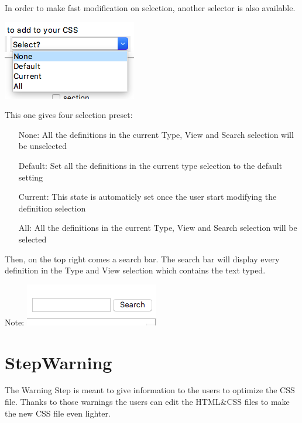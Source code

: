\documentclass[10pt,letterpaper]{article}
\begin{document}
In order to make fast modification on selection, another selector is also available. 
\begin{center} 
\includegraphics[scale=0.6]{selectionselect}
\end{center}
This one gives four selection preset:
\begin{itemize}
\item[None:]All the definitions in the current Type, View and Search selection will be unselected
\item[Default:] Set all the definitions in the current type selection to the default setting
\item[Current:] This state is automaticly set once the user start modifying the definition selection
\item[All:]All the definitions in the current Type, View and Search selection will be selected\\
\end{itemize}
Then, on the top right comes a search bar. The search bar will display every definition in the Type and View selection which contains the text typed.
\begin{center} 

Note:
\includegraphics[scale=0.6]{searchbar}
\end{center}
\newpage
\section {StepWarning}
The Warning Step is meant to give information to the users to optimize the CSS file. Thanks to those warnings the users can edit the HTML\&CSS files to make the new CSS file even lighter.\\
\end{document}
